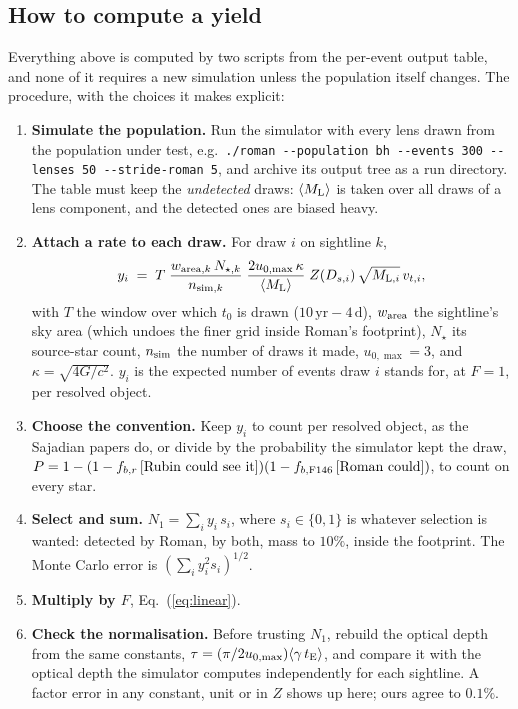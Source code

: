 \documentclass[english,10pt,a4paper]{article}
\newcommand{\tE}{t_{\rm E}}
\newcommand{\Ml}{M_{\rm L}}
\begin{document}
\subsection{How to compute a yield}
\label{sec:recipe}

Everything above is computed by two scripts from the per-event output table, and none of it
requires a new simulation unless the population itself changes. The procedure, with the
choices it makes explicit:

\begin{enumerate}
\item \textbf{Simulate the population.} Run the simulator with every lens drawn from the population
  under test, e.g.\ \verb|./roman --population bh --events 300 --lenses 50 --stride-roman 5|,
  and archive its output tree as a run directory. The table must keep the \emph{undetected}
  draws: $\langle\Ml\rangle$ is taken over all draws of a lens component, and the detected ones
  are biased heavy.
\item \textbf{Attach a rate to each draw.} For draw $i$ on sightline $k$,
  \begin{equation*}
  y_i \;=\; T\;\frac{w_{{\rm area},k}\,N_{\star,k}}{n_{{\rm sim},k}}\;
            \frac{2u_{0,\max}\,\kappa}{\langle\Ml\rangle}\;Z(D_{s,i})\,\sqrt{M_{{\rm L},i}}\,v_{t,i},
  \end{equation*}
  with $T$ the window over which $t_0$ is drawn ($10\,\mathrm{yr}-4\,\mathrm{d}$), $w_{\rm area}$ the
  sightline's sky area (which undoes the finer grid inside Roman's footprint), $N_\star$ its
  source-star count, $n_{\rm sim}$ the number of draws it made, $u_{0,\max}=3$, and
  $\kappa=\sqrt{4G/c^2}$. $y_i$ is the expected number of events draw $i$ stands for, at $F=1$,
  per resolved object.
\item \textbf{Choose the convention.} Keep $y_i$ to count per resolved object, as the Sajadian
  papers do, or divide by the probability the simulator kept the draw,
  $P = 1-(1-f_{b,r}\,[\text{Rubin could see it}])(1-f_{b,\rm F146}\,[\text{Roman could}])$, to count
  on every star.
\item \textbf{Select and sum.} $N_1=\sum_i y_i\,s_i$, where $s_i\in\{0,1\}$ is whatever selection is
  wanted: detected by Roman, by both, mass to $10\%$, inside the footprint. The Monte Carlo error
  is $(\sum_i y_i^2 s_i)^{1/2}$.
\item \textbf{Multiply by $F$}, Eq.~(\ref{eq:linear}).
\item \textbf{Check the normalisation.} Before trusting $N_1$, rebuild the optical depth from the
  same constants, $\tau=(\pi/2u_{0,\max})\langle\gamma\,\tE\rangle$, and compare it with the
  optical depth the simulator computes independently for each sightline. A factor error in any
  constant, unit or in $Z$ shows up here; ours agree to $0.1\%$.
\end{enumerate}
\end{document}
